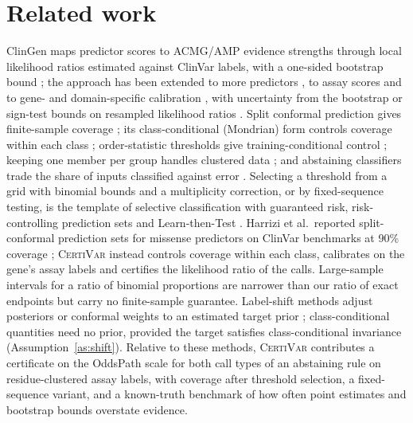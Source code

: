 \section{Related work}\label{sec:related}

ClinGen maps predictor scores to ACMG/AMP evidence strengths through local likelihood ratios estimated against ClinVar
labels, with a one-sided bootstrap bound \cite{Pejaver2022}; the approach has been extended to more predictors
\cite{Bergquist2025}, to assay scores \cite{Brnich2020,Fayer2021,Zeiberg2025} and to gene- and domain-specific
calibration \cite{Tejura2024,Chen2026,Badonyi2025}, with uncertainty from the bootstrap \cite{Pejaver2022,Bergquist2025}
or sign-test bounds on resampled likelihood ratios \cite{Badonyi2025}. Split conformal prediction gives finite-sample
coverage \cite{Vovk2005}; its class-conditional (Mondrian) form controls coverage within each class
\cite{Vovk2005,Sadinle2019}; order-statistic thresholds give training-conditional control \cite{Vovk2013,Tong2018};
keeping one member per group handles clustered data \cite{Dunn2023}; and abstaining classifiers trade the share of inputs
classified against error \cite{Chow1970}. Selecting a threshold from a grid with binomial bounds and a multiplicity
correction, or by fixed-sequence testing, is the template of selective classification with guaranteed risk, risk-controlling prediction sets and Learn-then-Test
\cite{Geifman2017,Bates2021rcps,Angelopoulos2025ltt}. Harrizi et al.\ reported split-conformal prediction sets for missense
predictors on ClinVar benchmarks at 90\% coverage \cite{Harrizi2026}; \textsc{CertiVar} instead controls
coverage within each class, calibrates on the gene's assay labels and certifies the likelihood ratio of the calls.
Large-sample intervals for a ratio of binomial proportions \cite{Katz1978,Koopman1984} are narrower than our ratio
of exact endpoints but carry no finite-sample guarantee. Label-shift methods adjust posteriors or conformal
weights to an estimated target prior \cite{Saerens2002,Lipton2018,Podkopaev2021}; class-conditional quantities need no
prior, provided the target satisfies class-conditional invariance (Assumption~\ref{as:shift}). Relative to these methods, \textsc{CertiVar} contributes a certificate on the OddsPath scale for both call types of
an abstaining rule on residue-clustered assay labels,
with coverage after threshold selection, a fixed-sequence variant, and a known-truth benchmark of how often point
estimates and bootstrap bounds overstate evidence.
